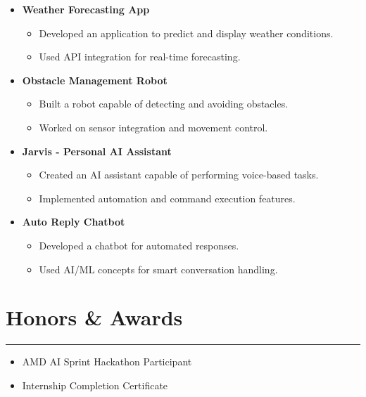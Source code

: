 \documentclass[letterpaper, 10pt]{article}
\begin{document}
\begin{itemize}

\item[]
\textbf{Weather Forecasting App}

\begin{itemize}
\item Developed an application to predict and display weather conditions.
\item Used API integration for real-time forecasting.
\end{itemize}

\item[]
\textbf{Obstacle Management Robot}

\begin{itemize}
\item Built a robot capable of detecting and avoiding obstacles.
\item Worked on sensor integration and movement control.
\end{itemize}

\item[]
\textbf{Jarvis - Personal AI Assistant}

\begin{itemize}
\item Created an AI assistant capable of performing voice-based tasks.
\item Implemented automation and command execution features.
\end{itemize}

\item[]
\textbf{Auto Reply Chatbot}

\begin{itemize}
\item Developed a chatbot for automated responses.
\item Used AI/ML concepts for smart conversation handling.
\end{itemize}

\end{itemize}

\section*{Honors \& Awards}
\hrule
\vspace{4pt}

\begin{itemize}

\item[] AMD AI Sprint Hackathon Participant

\item[] Internship Completion Certificate

\end{itemize}
\end{document}
